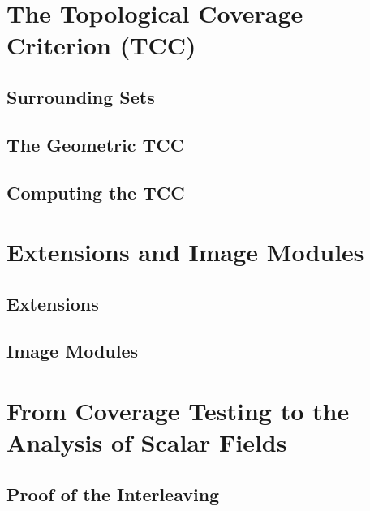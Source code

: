 \documentclass[12pt]{article}
\begin{document}
\clearpage
\section{The Topological Coverage Criterion (TCC)}


\subsection{Surrounding Sets}


\subsection{The Geometric TCC}\label{sec:geometric}


\subsection{Computing the TCC}
  


\clearpage
\section{Extensions and Image Modules}
%


\subsection{Extensions}
  

\subsection{Image Modules}


\clearpage
\section{From Coverage Testing to the Analysis of Scalar Fields}\label{sec:interleaving}





\subsection{Proof of the Interleaving}
  
\end{document}
